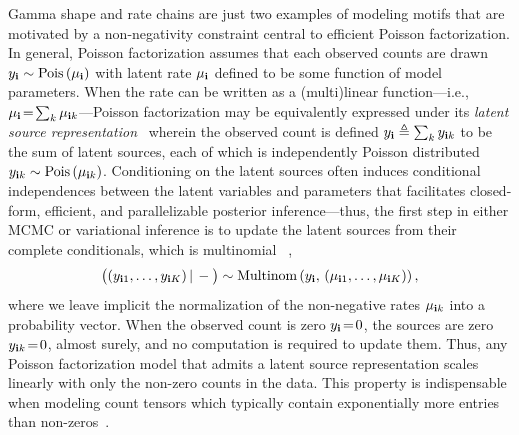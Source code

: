 \documentclass{article}
\begin{document}
Gamma shape and rate chains are just two examples of modeling motifs that are motivated by a non-negativity constraint central to efficient Poisson factorization. In general, Poisson factorization assumes that each observed counts are drawn $y_{\textbf{\textrm{i}}} \sim \textrm{Pois}\left( \mu_{\textbf{\textrm{i}}} \right)$ with latent rate $\mu_{\textbf{\textrm{i}}}$ defined to be some function of model parameters. When the rate can be written as a (multi)linear function---i.e., $\mu_{\textbf{\textrm{i}}} \!=\! \sum_{k}\mu_{\textbf{\textrm{i}} k}$---Poisson factorization may be equivalently expressed under its \emph{latent source representation}~\cite{Dunson2005bayesianlatent,cemgil2009bayesian} wherein the observed count is defined $y_{\textbf{\textrm{i}}} \triangleq \sum_k y_{\textbf{\textrm{i}} k}$ to be the sum of latent sources, each of which is independently Poisson distributed $y_{\textbf{\textrm{i}} k} \sim \textrm{Pois}\left( \mu_{\textbf{\textrm{i}} k} \right)$. Conditioning on the latent sources often induces conditional independences between the latent variables and parameters that facilitates closed-form, efficient, and parallelizable posterior inference---thus, the first step in either MCMC or variational inference is to update the latent sources from their complete conditionals, which is multinomial \cite{steel1953relation}~,
\begin{equation}
\label{eq:thinning}
\big((y_{\textbf{\textrm{i}}1},\dots,y_{\textbf{\textrm{i}} K})\,|\,-\big) \sim \textrm{Multinom}\left( y_{\textbf{\textrm{i}}},\, (\mu_{\textbf{\textrm{i}} 1},\dots, \mu_{\textbf{\textrm{i}} K}) \right),
\end{equation}
where we leave implicit the normalization of the non-negative rates $\mu_{\textbf{\textrm{i}} k}$ into a probability vector. When the observed count is zero $y_{\textbf{\textrm{i}}} \!=\! 0$, the sources are zero $y_{\textbf{\textrm{i}} k} \!=\! 0$, almost surely, and no computation is required to update them. Thus, any Poisson factorization model that admits a latent source representation scales linearly with only the non-zero counts in the data. This property is indispensable when modeling count tensors which typically contain exponentially more entries than non-zeros~\cite{bhattacharya2012simplex}. 
\end{document}
